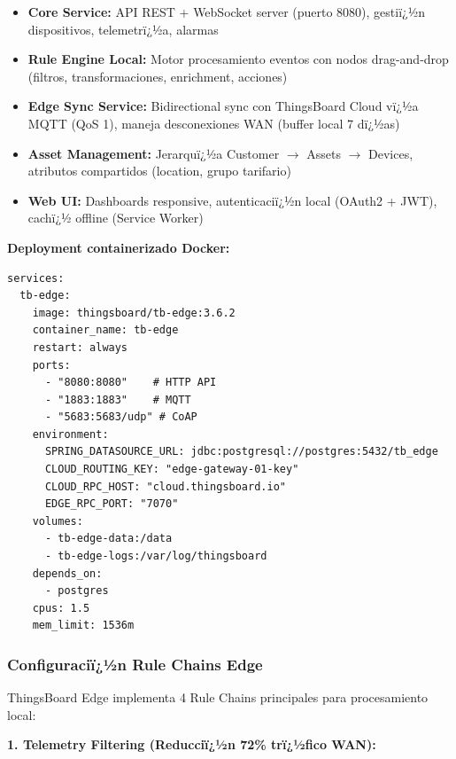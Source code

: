 \begin{itemize}
    \item \textbf{Core Service:} API REST + WebSocket server (puerto 8080), gestiï¿½n dispositivos, telemetrï¿½a, alarmas
    \item \textbf{Rule Engine Local:} Motor procesamiento eventos con nodos drag-and-drop (filtros, transformaciones, enrichment, acciones)
    \item \textbf{Edge Sync Service:} Bidirectional sync con ThingsBoard Cloud vï¿½a MQTT (QoS 1), maneja desconexiones WAN (buffer local 7 dï¿½as)
    \item \textbf{Asset Management:} Jerarquï¿½a Customer $\rightarrow$ Assets $\rightarrow$ Devices, atributos compartidos (location, grupo tarifario)
    \item \textbf{Web UI:} Dashboards responsive, autenticaciï¿½n local (OAuth2 + JWT), cachï¿½ offline (Service Worker)
\end{itemize}

\textbf{Deployment containerizado Docker:}

\begin{verbatim}
services:
  tb-edge:
    image: thingsboard/tb-edge:3.6.2
    container_name: tb-edge
    restart: always
    ports:
      - "8080:8080"    # HTTP API
      - "1883:1883"    # MQTT
      - "5683:5683/udp" # CoAP
    environment:
      SPRING_DATASOURCE_URL: jdbc:postgresql://postgres:5432/tb_edge
      CLOUD_ROUTING_KEY: "edge-gateway-01-key"
      CLOUD_RPC_HOST: "cloud.thingsboard.io"
      EDGE_RPC_PORT: "7070"
    volumes:
      - tb-edge-data:/data
      - tb-edge-logs:/var/log/thingsboard
    depends_on:
      - postgres
    cpus: 1.5
    mem_limit: 1536m
\end{verbatim}

\subsubsection{Configuraciï¿½n Rule Chains Edge}

ThingsBoard Edge implementa 4 Rule Chains principales para procesamiento local:

\textbf{1. Telemetry Filtering (Reducciï¿½n 72\% trï¿½fico WAN):}

